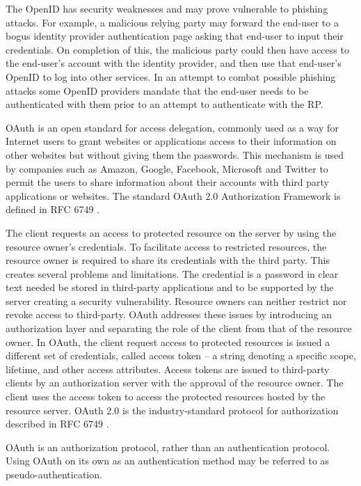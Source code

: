 \begin{multicols}{2}
The OpenID has security weaknesses and may prove vulnerable to phishing attacks. For example, a malicious relying party may forward the end-user to a bogus identity provider authentication page asking that end-user to input their credentials. On completion of this, the malicious party could then have access to the end-user's account with the identity provider, and then use that end-user's OpenID to log into other services. In an attempt to combat possible phishing attacks some OpenID providers mandate that the end-user needs to be authenticated with them prior to an attempt to authenticate with the RP.

OAuth is an open standard for access delegation, commonly used as a way for Internet users to grant websites or applications access to their information on other websites but without giving them the passwords. This mechanism is used by companies such as Amazon, Google, Facebook, Microsoft and Twitter to permit the users to share information about their accounts with third party applications or websites. The standard OAuth 2.0 Authorization Framework is defined in RFC 6749 \cite{chap2-key26}.

The client requests an access to protected resource on the server by using the resource owner's credentials. To facilitate access to restricted resources, the resource owner is required to share its credentials with the third party. This creates several problems and limitations. The credential is a password in clear text needed be stored in third-party applications and to be supported by the server creating a security vulnerability. Resource owners can neither restrict nor revoke access to third-party. OAuth addresses these issues by introducing an authorization layer and separating the role of the client from that of the resource owner. In OAuth, the client request access to protected resources is issued a different set of credentials, called access token -- a string denoting a specific scope, lifetime, and other access attributes. Access tokens are issued to third-party clients by an authorization server with the  approval of the resource owner. The client uses the access token to access the protected resources hosted by the resource server. OAuth 2.0 is the industry-standard protocol for authorization described in RFC 6749 \cite{chap2-key21}.

OAuth is an authorization protocol, rather than an authentication protocol. Using OAuth on its own as an authentication method may be referred to as pseudo-authentication. 
\bigskip


\end{multicols}
